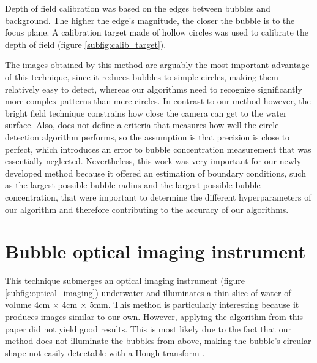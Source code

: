 	Depth of field calibration was based on the edges between bubbles and background. The higher the edge's magnitude, the closer the bubble is to the focus plane. A calibration target made of hollow circles was used to calibrate the depth of field (figure \ref{subfig:calib_target}). 
	
	The images obtained by this method are arguably the most important advantage of this technique, since it reduces bubbles to simple circles, making them relatively easy to detect, whereas our algorithms need to recognize significantly more complex patterns than mere circles.
	 In contrast to our method however, the bright field technique constrains how close the camera can get to the water surface. Also, \citet{Leonie} does not define a criteria that measures how well the circle detection algorithm performs, so the assumption is that precision is close to perfect, which introduces an error to bubble concentration measurement that was essentially neglected. 
	 Nevertheless, this work was very important for our newly developed method because it offered an estimation of boundary conditions, such as the largest possible bubble radius and the largest possible bubble concentration, that were important to determine the different hyperparameters of our algorithm and therefore contributing to the accuracy of our algorithms. 
	
	
\section{Bubble optical imaging instrument}
	This technique submerges an optical imaging instrument (figure \ref{subfig:optical_imaging}) underwater and illuminates a thin slice	of water of volume 4cm $\times$ 4cm $\times$ 5mm. This method is particularly interesting because it produces images similar to our own. However, applying the algorithm from this paper did not yield good results. This is most likely due to the fact that our method does not illuminate the bubbles from above, making the bubble's circular shape not easily detectable with a Hough transform \citep{Hough1972} \citep{Al-Lashi2016}.
	
